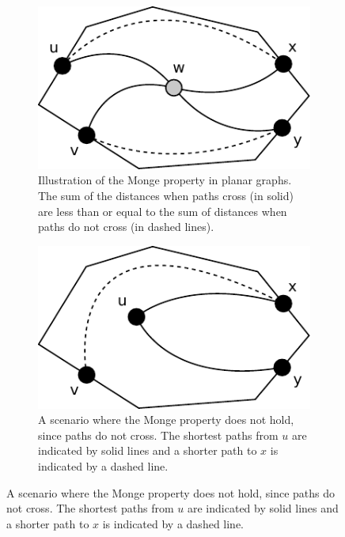 \begin{figure}
  \centering
  \begin{subfigure}[b]{0.45\textwidth}
    \includegraphics[width=\textwidth]{figs/monge.pdf}
    \caption{Illustration of the Monge property in planar graphs. The sum of the distances
  when paths cross (in solid) are less than or equal to the sum of distances when paths
do not cross (in dashed lines).}
    \label{monge}
  \end{subfigure}
  \quad
  \begin{subfigure}[b]{0.45\textwidth}
    \includegraphics[width=\textwidth]{figs/monge2.pdf}
    \caption{A scenario where the Monge property does not hold, since paths
      do not cross. The shortest paths from $u$ are
      indicated by solid lines and a shorter path to $x$ is indicated by a dashed line.}
    \label{monge2}
  \end{subfigure}
\end{figure}

